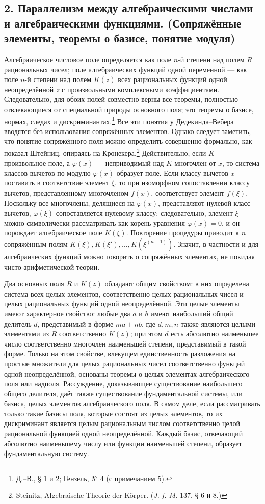 \documentclass[11pt]{article}
\begin{document}
\subsection*{2. Параллелизм между алгебраическими числами и алгебраическими функциями. (Сопряжённые элементы, теоремы о базисе, понятие модуля)}
Алгебраическое числовое поле определяется как поле \(n\)-й степени над полем \(R\) рациональных чисел; поле алгебраических функций одной переменной --- как поле \(n\)-й степени над полем \(K(z)\) всех рациональных функций одной неопределённой \(z\) с произвольными комплексными коэффициентами. Следовательно, для обоих полей совместно верны все теоремы, полностью отвлекающиеся от специальной природы основного поля; это теоремы о базисе, нормах, следах и дискриминантах.\footnote{Д.--В., § 1 и 2; Гензель, № 4 (с примечанием 5).} Все эти понятия у Дедекинда--Вебера вводятся без использования сопряжённых элементов. Однако следует заметить, что понятие сопряжённого поля можно определить совершенно формально, как показал Штейниц, опираясь на Кронекера.\footnote{Steinitz, Algebraische Theorie der Körper. (\emph{J. f. M.} 137, § 6 и 8.)} Действительно, если \(K\) --- произвольное поле, а \(\varphi(x)\) --- неприводимый над \(K\) многочлен от \(x\), то система классов вычетов по модулю \(\varphi(x)\) образует поле. Если классу вычетов \(x\) поставить в соответствие элемент \(\xi\), то при изоморфном сопоставлении классу вычетов, представленному многочленом \(f(x)\), соответствует элемент \(f(\xi)\). Поскольку все многочлены, делящиеся на \(\varphi(x)\), представляют нулевой класс вычетов, \(\varphi(\xi)\) сопоставляется нулевому классу; следовательно, элемент \(\xi\) можно символически рассматривать как корень уравнения \(\varphi(x)=0\), и он порождает алгебраическое поле \(K(\xi)\). Повторение процедуры приводит к \(n\) сопряжённым полям \(K(\xi), K(\xi'),\ldots,K(\xi^{(n-1)})\). Значит, в частности и для алгебраических функций можно говорить о сопряжённых элементах, не покидая чисто арифметической теории.

Два основных поля \(R\) и \(K(z)\) обладают общим свойством: в них определена система всех целых элементов, соответственно целых рациональных чисел и целых рациональных функций одной неопределённой. Эти целые элементы имеют характерное свойство: любые два \(a\) и \(b\) имеют наибольший общий делитель \(d\), представимый в форме \(ma+nb\), где \(d,m,n\) также являются целыми элементами из \(R\) соответственно \(K(z)\); при этом \(d\) есть абсолютно наименьшее число соответственно многочлен наименьшей степени, представимый в такой форме. Только на этом свойстве, влекущем единственность разложения на простые множители для целых рациональных чисел соответственно функций одной неопределённой, основаны теоремы о целых элементах алгебраического поля или надполя. Рассуждение, доказывающее существование наибольшего общего делителя, даёт также существование фундаментальной системы, или базиса, целых элементов алгебраического поля. В самом деле, если рассматривать только такие базисы поля, которые состоят из целых элементов, то их дискриминант является целым рациональным числом соответственно целой рациональной функцией одной неопределённой. Каждый базис, отвечающий абсолютно наименьшему числу или функции наименьшей степени, образует фундаментальную систему.
\end{document}

